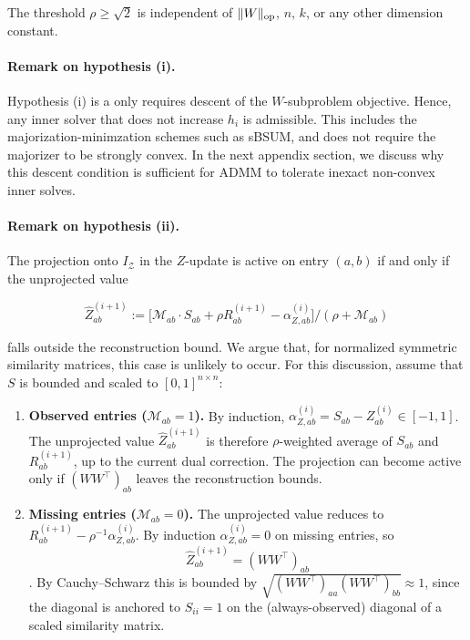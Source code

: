\documentclass{article}
\begin{document}
The threshold $\rho \geq \sqrt 2$ is independent of $\|W\|_{\rm op}$, $n$, $k$, or any other dimension constant.

\paragraph{Remark on hypothesis (i).}
Hypothesis (i) is a only requires descent of the $W$-subproblem objective. Hence, any inner solver that does not increase $h_i$ is admissible. This includes the majorization-minimzation schemes such as sBSUM, and does not require the majorizer to be strongly convex. In the next appendix section, we discuss why this descent condition is sufficient for ADMM to tolerate inexact non-convex inner solves.

\paragraph{Remark on hypothesis (ii).}
The projection onto $I_{\mathcal{Z}}$ in the $Z$-update is active on entry $(a,b)$ if and only if the unprojected value 

\[
\widehat Z_{ab}^{(i+1)} := \bigl[\mathcal{M}_{ab} \cdot S_{ab} + \rho R_{ab}^{(i+1)} - \alpha_{Z,ab}^{(i)}\bigr] \big/ (\rho + \mathcal{M}_{ab})
\]

falls outside the reconstruction bound. We argue that, for normalized symmetric similarity matrices, this case is unlikely to occur. For this discussion, assume that $S$ is bounded and scaled to $[0, 1]^{n \times n}$:

\begin{enumerate}
    \item \textbf{Observed entries ($\mathcal{M}_{ab}=1$).} 
    By induction, $\alpha_{Z,ab}^{(i)} = S_{ab} - Z_{ab}^{(i)} \in [-1, 1]$. The unprojected value $\widehat Z_{ab}^{(i+1)}$ is therefore $\rho$-weighted average of $S_{ab}$ and $R_{ab}^{(i+1)}$, up to the current dual correction. The projection can become active only if $(WW^{\top})_{ab}$ leaves the reconstruction bounds.
    \item \textbf{Missing entries ($\mathcal{M}_{ab}=0$).} 
    The unprojected value reduces to $R^{(i+1)}_{ab} - \rho^{-1}\alpha_{Z,ab}^{(i)}$. 
    By induction $\alpha_{Z,ab}^{(i)} = 0$ on missing entries, so 
    \[
    \widehat Z_{ab}^{(i+1)} = (WW^{\top})_{ab}
    \].
    By Cauchy--Schwarz this is bounded by $\sqrt{(WW^{\top})_{aa}(WW^{\top})_{bb}} \approx 1$, since the diagonal is anchored to $S_{ii}=1$ on the (always-observed) diagonal of a scaled similarity matrix.
\end{enumerate}
\end{document}
